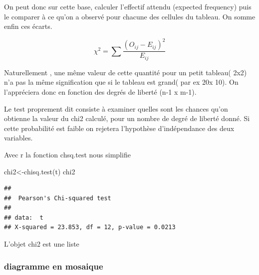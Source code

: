 \documentclass[
]{book}
\newenvironment{Shaded}{\begin{snugshade}}{\end{snugshade}}
\newcommand{\AttributeTok}[1]{\textcolor[rgb]{0.77,0.63,0.00}{#1}}
\newcommand{\CommentTok}[1]{\textcolor[rgb]{0.56,0.35,0.01}{\textit{#1}}}
\newcommand{\DecValTok}[1]{\textcolor[rgb]{0.00,0.00,0.81}{#1}}
\newcommand{\FunctionTok}[1]{\textcolor[rgb]{0.00,0.00,0.00}{#1}}
\newcommand{\NormalTok}[1]{#1}
\newcommand{\OtherTok}[1]{\textcolor[rgb]{0.56,0.35,0.01}{#1}}
\newcommand{\SpecialCharTok}[1]{\textcolor[rgb]{0.00,0.00,0.00}{#1}}
\begin{document}
On peut donc sur cette base, calculer l'effectif attendu (expected frequency) puis le comparer à ce qu'on a observé pour chacune des cellules du tableau. On somme enfin ces écarts.

\[\chi^2 = \sum \frac {(O_{ij} - E_{ij})^2}{E_{ij}}\]

Naturellement , une même valeur de cette quantité pour un petit tableau( 2x2) n'a pas la même signification que si le tableau est grand( par ex 20x 10). On l'appréciera donc en fonction des degrés de liberté (n-1 x m-1).

Le test proprement dit consiste à examiner quelles sont les chances qu'on obtienne la valeur du chi2 calculé, pour un nombre de degré de liberté donné. Si cette probabilité est faible on rejetera l'hypothèse d'indépendance des deux variables.

Avec r la fonction chsq.test nous simplifie

\begin{Shaded}
\begin{Highlighting}[]
\NormalTok{chi2}\OtherTok{\textless{}{-}}\FunctionTok{chisq.test}\NormalTok{(t)}
\NormalTok{chi2}
\end{Highlighting}
\end{Shaded}

\begin{verbatim}
## 
##  Pearson's Chi-squared test
## 
## data:  t
## X-squared = 23.853, df = 12, p-value = 0.0213
\end{verbatim}

L'objet chi2 est une liste

\begin{Shaded}
\end{Shaded}

\hypertarget{diagramme-en-mosaique}{%
\subsubsection{diagramme en mosaique}\label{diagramme-en-mosaique}}
\end{document}
